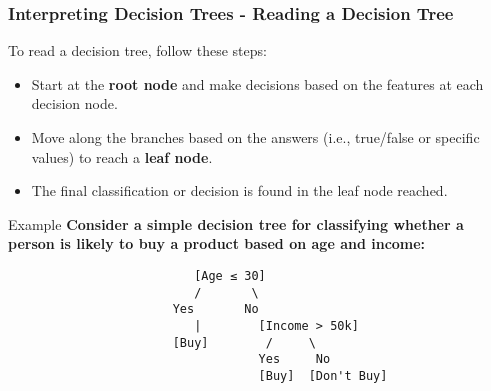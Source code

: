 \documentclass[aspectratio=169]{beamer}
\begin{document}
\begin{frame}[fragile]
    \frametitle{Interpreting Decision Trees - Reading a Decision Tree}

    To read a decision tree, follow these steps:
    \begin{itemize}
        \item Start at the \textbf{root node} and make decisions based on the features at each decision node.
        \item Move along the branches based on the answers (i.e., true/false or specific values) to reach a \textbf{leaf node}.
        \item The final classification or decision is found in the leaf node reached.
    \end{itemize}

    \begin{block}{Example}
        \textbf{Consider a simple decision tree for classifying whether a person is likely to buy a product based on age and income:}
        
        \begin{verbatim}
                          [Age ≤ 30]
                          /       \
                       Yes       No
                          |        [Income > 50k]
                       [Buy]        /     \
                                   Yes     No
                                   [Buy]  [Don't Buy]
        \end{verbatim}
    \end{block}
\end{frame}
\end{document}
